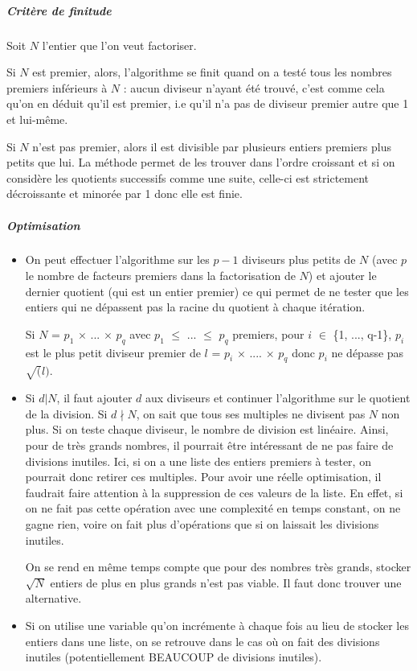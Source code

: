 \documentclass[11pt,a4paper]{article}
\begin{document}
		\subparagraph{Critère de finitude}	
		
		Soit $\mathit{N}$ l'entier que l'on veut factoriser. 
		
		Si $\mathit{N}$ est premier, alors, l'algorithme se finit quand on a testé tous les nombres premiers inférieurs à $\mathit{N}$ : aucun diviseur n'ayant été trouvé, c'est comme cela qu'on en déduit qu'il est premier, i.e qu'il n'a pas de diviseur premier autre que 1 et lui-même. 
		
		Si $\mathit{N}$ n'est pas premier, alors il est divisible par plusieurs entiers premiers plus petits que lui. La méthode permet de les trouver dans l'ordre croissant et si on considère les quotients successifs comme une suite, celle-ci est strictement décroissante et minorée par 1 donc elle est finie.
	
		\subparagraph{Optimisation}
	\begin{itemize}	
		\item On peut effectuer l'algorithme sur les $\mathit{p-1}$ diviseurs plus petits de $\mathit{N}$ (avec $\mathit{p}$ le nombre de facteurs premiers dans la factorisation de $\mathit{N}$) et ajouter le dernier quotient (qui est un entier premier) ce qui permet de ne tester que les entiers qui ne dépassent pas la racine du quotient à chaque itération.
		
		Si $N$ = $p_1$ $\times$ ... $\times$ $p_q$ avec $p_1$ $\leq$ ... $\leq$ $p_q$ premiers, pour $i$ $\in$ \{1, ..., q-1\}, $p_i$ est le plus petit diviseur premier de $l$ = $p_i$ $\times$ .... $\times$ $p_q$ donc $p_i$ ne dépasse pas $\sqrt(l)$.
		
		\item Si $\mathit{d|N}$, il faut ajouter $\mathit{d}$ aux diviseurs et continuer l'algorithme sur le quotient de la division. Si $\mathit{d \nmid N}$, on sait que tous ses multiples ne divisent pas $\mathit{N}$ non plus. Si on teste chaque diviseur, le nombre de division est linéaire. Ainsi, pour de très grands nombres, il pourrait être intéressant de ne pas faire de divisions inutiles. Ici, si on a une liste des entiers premiers à tester, on pourrait donc retirer ces multiples. Pour avoir une réelle optimisation, il faudrait faire attention à la suppression de ces valeurs de la liste. En effet, si on ne fait pas cette opération avec une complexité en temps constant, on ne gagne rien, voire on fait plus d'opérations que si on laissait les divisions inutiles. 
		
		On se rend en même temps compte que pour des nombres très grands, stocker $\sqrt{N}$ entiers de plus en plus grands n'est pas viable. Il faut donc trouver une alternative.
		
		\item Si on utilise une variable qu'on incrémente à chaque fois au lieu de stocker les entiers dans une liste, on se retrouve dans le cas où on fait des divisions inutiles (potentiellement BEAUCOUP de divisions inutiles).
	\end{itemize}
\end{document}
